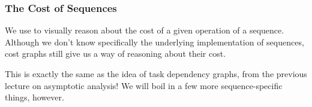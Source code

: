\documentclass[aspectratio=169, handout]{beamer}
\begin{document}

\begin{frame}[fragile]
  \frametitle{The Cost of Sequences}

  We use  to visually reason about the cost of a given
  operation of a sequence. Although we don't know specifically the underlying
  implementation of sequences, cost graphs still give us a way of reasoning
  about their cost.

  \pause
  \vspace{\fill}


  \pause
  \vspace{\fill}

  This is exactly the same as the idea of task dependency graphs, from
  the previous lecture on asymptotic analysis! We will boil in a few more
  sequence-specific things, however.
\end{frame}
\end{document}
